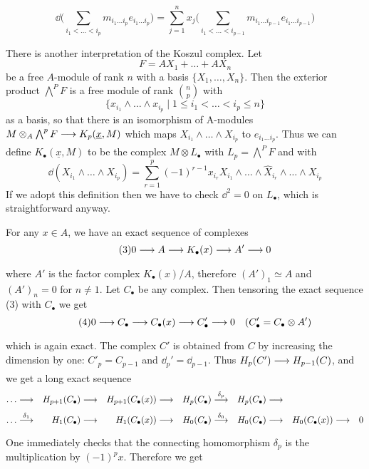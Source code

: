 \documentclass[../main]{subfiles}
\begin{document}
\[\tag{18.2}\label{eqn:18.2} \dd\bigg(\sum_{i_1<\dots<i_p}m_{i_1 \dots i_{p}} e_{i_{1} \dots i_{p}} \bigg)=\sum_{j=1}^n x_j\bigg( \sum_{i_1<\dots<i_{p-1}}m_{i_1 \dots i_{p-1}} e_{i_{1} \dots i_{p-1}}\bigg)\]

There is another interpretation of the Koszul complex.
Let \[F=A X_{1}+\dots+AX_{n}\] be a free $A$-module of rank $n$ with a
basis $\{X_{1}, \dots, X_{n}\}$. Then the exterior product $\bigwedge^{P} F$ is a
free module of rank $\displaystyle\binom{n}{p}$ with \[\{x_{i_{1}} \wedge \dots \wedge x_{i_{p}} \mid 1 \leqslant i_{1}<\dots<i_{p} \leqslant n\}\]
as a basis, so that there is an isomorphism of A-modules $M \otimes_{A} \bigwedge^{p} F\varrightarrow{} K_{p}(\underline{x}, M)$ which maps $X_{i_{1}} \wedge \dots \wedge X_{i_{p}}$ to $e_{i_{1} \dots i_{p}}$.
Thus we can define $K_\bullet(\underline{x}, M)$ to be the complex $M \otimes L_\bullet$ with $L_{p}=\bigwedge^PF$ and with
\[\dd(X_{i_1}\wedge\dots \wedge X_{i_p}) = \sum_{r=1}^p (-1)^{r-1} x_{i_r} X_{i_1}\wedge\dots \wedge\widehat{X}_{i_r} \wedge\dots\wedge X_{i_p}\]
 If we adopt this definition then we have to check $\dd^{2}=0$ on $L_\bullet$, which is straightforward anyway.

For any $x \in A$, we have an exact sequence of complexes
\[\tag{3} 0 \varrightarrow{} A \varrightarrow{} K_\bullet (x) \varrightarrow{} A' \varrightarrow{}0\]
where $A'$ is the factor complex $K_\bullet(x) / A$, therefore $(A')_{1} \simeq A$ and $(A')_{n}=0$ for $n \neq 1$. Let $C_\bullet$ be any complex. Then tensoring the exact sequence (3) with $C_\bullet$ we get
\[\tag{4}
0 \varrightarrow{} C_\bullet\varrightarrow{}C_\bullet(x) \varrightarrow{} C'_\bullet\varrightarrow{}0 \for{C'_\bullet=C_\bullet \otimes A'}
\]
which is again exact. The complex $C'$ is obtained from $C$ by increasing the dimension by one: $C'_{p}=C_{p-1}$ and $\dd_p' = \dd_{p-1}$. Thus $H_{p}(C') \varrightarrow{} H_{p-1}(C)$, and we get a long exact sequence
\[\begin{aligned}\dots &\varrightarrow{}& H_{p+1}(C_\bullet) &\varrightarrow{}& H_{p+1}(C_\bullet (x))& \varrightarrow{}& H_p(C_\bullet) &\varrightarrow{\delta_p}& H_p(C_\bullet)&\varrightarrow{}& \\ \dots &\varrightarrow{\delta_1}&H_1(C_\bullet)&\varrightarrow{}&H_1(C_\bullet(x))&\varrightarrow{}&H_0(C_\bullet)&\varrightarrow{\delta_0}&H_0(C_\bullet)&\varrightarrow{}&H_0(C_\bullet(x))&\varrightarrow{}&0\end{aligned}\]
One immediately checks that the connecting homomorphism $\delta_{p}$ is the multiplication by $(-1)^{p} x$. Therefore we get
\end{document}
